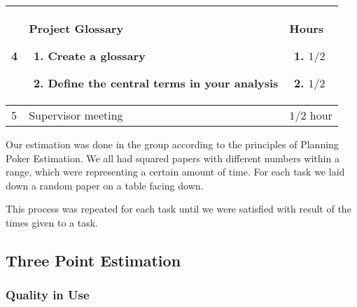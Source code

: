 \begin{center}
\begin{tabular}{ | l |  p{5cm} | p{5cm} |}
	4 & Project Glossary \begin{enumerate}
	\item Create a glossary
	\item Define the central terms in your analysis
	\end{enumerate} & Hours \begin{enumerate}
		\item $1/2$ 
		\item $1/2$
	\end{enumerate}\\ \hline
	
	5 & Supervisor meeting & $1/2$ hour

	\\
	\hline
    \end{tabular}
\end{center}


Our estimation was done in the group according to the principles of Planning Poker Estimation. We all had squared papers with different numbers within a range, which were representing a certain amount of time. For each task we laid down a random paper on a table facing down. 


This process was repeated for each task until we were satisfied with result of the times given to a task.


\subsection*{Three Point Estimation}
\subsubsection*{Quality in Use}

